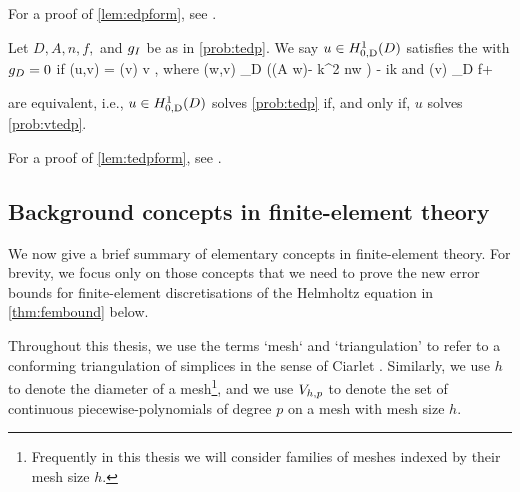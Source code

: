 For a proof of \cref{lem:edpform}, see \cite[Lemma 3.3]{GrPeSp:19}.

\bprob[Variational formulation of TEDP when $\gD = 0$]\label{prob:vtedp}
Let $D, A, n, f,$ and $g_{I}$ be as in \cref{prob:tedp}. We say $u \in \HozDD$ satisfies the  with $\gD = 0$ if
\beq\label{eq:vtedp}
\aT(u,v) = \FT(v) \tfa v \in \HozDD,
\eeq
where
\beq\label{eq:aT}
\aT(w,v) \de \int_{D} \big(\mleft(A \grad w\mright)\cdot\grad \vbar - k^2 n\minispace w \vbar\big) - ik
\eeq
and
\beqs
\FT(v) \de \int_{D} f\minispace\vbar + 
\eeqs
\eprob

\label{lem:tedpform}
 are equivalent, i.e., $u \in \HozDD$ solves \cref{prob:tedp} if, and only if, $u$ solves \cref{prob:vtedp}.
\ele

For a proof of \cref{lem:tedpform}, see \cite[Lemma A.7]{GrPeSp:19}.
  
\subsection{Background concepts in finite-element theory}\label{sec:fetheory}

We now give a brief summary of elementary concepts in finite-element theory. For brevity, we focus only on those concepts that we need to prove the new error bounds for finite-element discretisations of the Helmholtz equation in \cref{thm:fembound} below.

Throughout this thesis, we use the terms `mesh` and `triangulation' to refer to a conforming triangulation of simplices in the sense of Ciarlet \cite[Paragraphs (FEM1) p. 61 and ($\cT_{h}$5) p. 71]{Ci:91}. Similarly, we use $h$ to denote the diameter of a mesh\footnote{Frequently in this thesis we will consider families of meshes indexed by their mesh size $h$.}, and we use $V_{h,p}$ to denote the set of continuous piecewise-polynomials of degree $p$ on a mesh with mesh size $h$.


